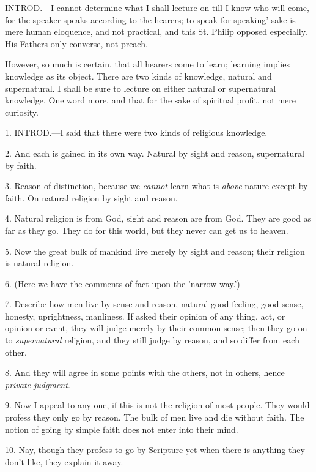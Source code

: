 
INTROD.—I
cannot determine what I shall lecture on till I know who will come,
for the speaker speaks according to the hearers; to speak for speaking'
sake is mere human eloquence, and not practical, and this St. Philip
opposed especially. His Fathers only converse, not preach.

However, so much is certain, that all hearers
come to learn; learning implies knowledge as its object. There are two
kinds of knowledge, natural and supernatural. I shall be sure to
lecture on either natural or supernatural knowledge. One word more,
and that for the sake of spiritual profit, not mere curiosity.


1. INTROD.—I
said that there were two kinds of religious knowledge.

2. And each is gained in its own way. Natural by
sight and reason, supernatural by faith.

3. Reason of distinction, because we \emph{cannot}
learn what is \emph{above} nature except by faith. On natural religion
by sight and reason.

4. Natural religion is from God, sight and reason
are from God. They are good as far as they go. They do for this world,
but they never can get us to heaven.

5. Now the great bulk of mankind live merely by
sight and reason; their religion is natural religion.

6. (Here we have the comments of fact upon the
'narrow way.')

7. Describe how men live by sense and reason,
natural good feeling, good sense, honesty, uprightness, manliness. If
asked their opinion of any thing, act, or opinion or event, they will
judge merely by their common sense; then they go on to \emph{supernatural}
religion, and they still judge by reason, and so differ from each
other.

8. And they will agree in some points with the
others, not in others, hence \emph{private judgment}.

9. Now I appeal to any one, if this is not the
religion of most people. They would profess they only go by reason.
The bulk of men live and die without faith. The notion of going by
simple faith does not enter into their mind.

10. Nay, though they profess to go by Scripture
yet when there is anything they don't like, they explain it away.


